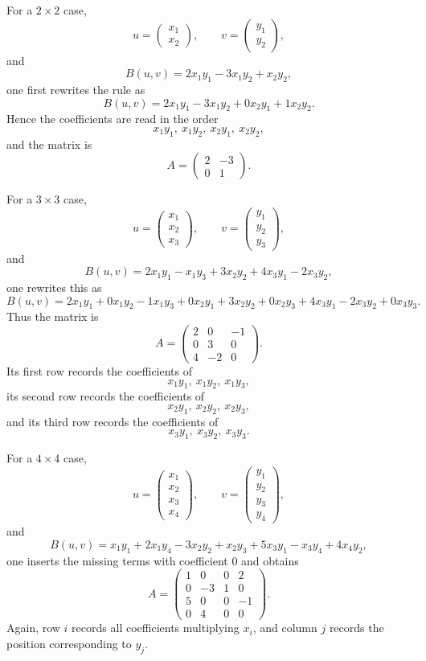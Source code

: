 \documentclass{article}
\begin{document}
	For a $2\times 2$ case,
	$$
	u=\begin{pmatrix}x_1\\x_2\end{pmatrix},
	\qquad
	v=\begin{pmatrix}y_1\\y_2\end{pmatrix},
	$$
	and
	$$
	B(u,v)=2x_1y_1-3x_1y_2+x_2y_2,
	$$
	one first rewrites the rule as
	$$
	B(u,v)=2x_1y_1-3x_1y_2+0x_2y_1+1x_2y_2.
	$$
	Hence the coefficients are read in the order
	$$
	x_1y_1,\ x_1y_2,\ x_2y_1,\ x_2y_2,
	$$
	and the matrix is
	$$
	A=
	\begin{pmatrix}
		2 & -3\\
		0 & 1
	\end{pmatrix}.
	$$
	
	For a $3\times 3$ case,
	$$
	u=\begin{pmatrix}x_1\\x_2\\x_3\end{pmatrix},
	\qquad
	v=\begin{pmatrix}y_1\\y_2\\y_3\end{pmatrix},
	$$
	and
	$$
	B(u,v)=2x_1y_1-x_1y_3+3x_2y_2+4x_3y_1-2x_3y_2,
	$$
	one rewrites this as
	$$
	B(u,v)=2x_1y_1+0x_1y_2-1x_1y_3+0x_2y_1+3x_2y_2+0x_2y_3+4x_3y_1-2x_3y_2+0x_3y_3.
	$$
	Thus the matrix is
	$$
	A=
	\begin{pmatrix}
		2 & 0 & -1\\
		0 & 3 & 0\\
		4 & -2 & 0
	\end{pmatrix}.
	$$
	Its first row records the coefficients of
	$$
	x_1y_1,\ x_1y_2,\ x_1y_3,
	$$
	its second row records the coefficients of
	$$
	x_2y_1,\ x_2y_2,\ x_2y_3,
	$$
	and its third row records the coefficients of
	$$
	x_3y_1,\ x_3y_2,\ x_3y_3.
	$$
	
	For a $4\times 4$ case,
	$$
	u=\begin{pmatrix}x_1\\x_2\\x_3\\x_4\end{pmatrix},
	\qquad
	v=\begin{pmatrix}y_1\\y_2\\y_3\\y_4\end{pmatrix},
	$$
	and
	$$
	B(u,v)=x_1y_1+2x_1y_4-3x_2y_2+x_2y_3+5x_3y_1-x_3y_4+4x_4y_2,
	$$
	one inserts the missing terms with coefficient $0$ and obtains
	$$
	A=
	\begin{pmatrix}
		1 & 0 & 0 & 2\\
		0 & -3 & 1 & 0\\
		5 & 0 & 0 & -1\\
		0 & 4 & 0 & 0
	\end{pmatrix}.
	$$
	Again, row $i$ records all coefficients multiplying $x_i$, and column $j$ records the position corresponding to $y_j$.
	
\end{document}
